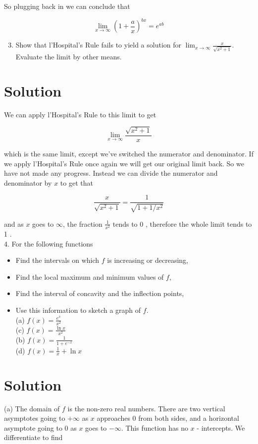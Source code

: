 \documentclass[10pt]{article}
\begin{document}
So plugging back in we can conclude that

$$
\lim _{x \rightarrow \infty}\left(1+\frac{a}{x}\right)^{b x}=e^{a b}
$$

\begin{enumerate}
  \setcounter{enumi}{2}
  \item Show that l'Hospital's Rule fails to yield a solution for $\lim _{x \rightarrow \infty} \frac{x}{\sqrt{x^{2}+1}}$. Evaluate the limit by other means.
\end{enumerate}

\section*{Solution}
We can apply l'Hospital's Rule to this limit to get

$$
\lim _{x \rightarrow \infty} \frac{\sqrt{x^{2}+1}}{x}
$$

which is the same limit, except we've switched the numerator and denominator. If we apply l'Hospital's Rule once again we will get our original limit back. So we have not made any progress. Instead we can divide the numerator and denominator by $x$ to get that

$$
\frac{x}{\sqrt{x^{2}+1}}=\frac{1}{\sqrt{1+1 / x^{2}}}
$$

and as $x$ goes to $\infty$, the fraction $\frac{1}{x^{2}}$ tends to 0 , therefore the whole limit tends to 1 .\\
4. For the following functions

\begin{itemize}
  \item Find the intervals on which $f$ is increasing or decreasing,
  \item Find the local maximum and minimum values of $f$,
  \item Find the interval of concavity and the inflection points,
  \item Use this information to sketch a graph of $f$.\\
(a) $f(x)=\frac{e^{x}}{x^{2}}$\\
(c) $f(x)=\frac{\ln x}{x^{2}}$\\
(b) $f(x)=\frac{1}{1+e^{-x}}$\\
(d) $f(x)=\frac{1}{x}+\ln x$
\end{itemize}

\section*{Solution}
(a) The domain of $f$ is the non-zero real numbers. There are two vertical asymptotes going to $+\infty$ as $x$ approaches 0 from both sides, and a horizontal asymptote going to 0 as $x$ goes to $-\infty$. This function has no $x$ - intercepts. We differentiate to find
\end{document}
